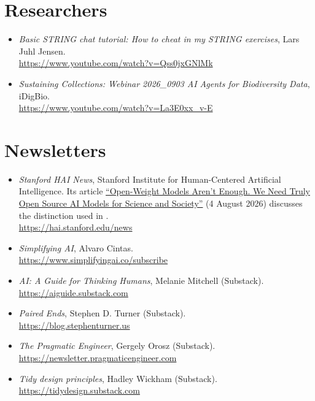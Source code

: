 \section{Researchers}

\begin{itemize}
  \item \emph{Basic STRING chat tutorial: How to cheat in my STRING exercises},
    Lars Juhl Jensen.\\
    \url{https://www.youtube.com/watch?v=Qss0jxGNlMk}
  \item \emph{Sustaining Collections: Webinar 2026\_0903 AI Agents for
    Biodiversity Data}, iDigBio.\\
    \url{https://www.youtube.com/watch?v=La3E0xx_v-E}
\end{itemize}

\section{Newsletters}

\begin{itemize}
  \item \emph{Stanford HAI News}, Stanford Institute for Human-Centered
    Artificial Intelligence. Its article
    \href{https://hai.stanford.edu/news/open-weight-models-arent-enough-we-need-truly-open-source-ai-models-for-science-and-society}{``Open-Weight Models Aren't Enough. We Need Truly Open Source AI Models for Science and Society''}
    (4 August 2026) discusses the distinction used in .\\
    \url{https://hai.stanford.edu/news}
  \item \emph{Simplifying AI}, Alvaro Cintas.\\
    \url{https://www.simplifyingai.co/subscribe}
  \item \emph{AI: A Guide for Thinking Humans}, Melanie Mitchell (Substack).\\
    \url{https://aiguide.substack.com}
  \item \emph{Paired Ends}, Stephen D. Turner (Substack).\\
    \url{https://blog.stephenturner.us}
  \item \emph{The Pragmatic Engineer}, Gergely Orosz (Substack).\\
    \url{https://newsletter.pragmaticengineer.com}
  \item \emph{Tidy design principles}, Hadley Wickham (Substack).\\
    \url{https://tidydesign.substack.com}
\end{itemize}

